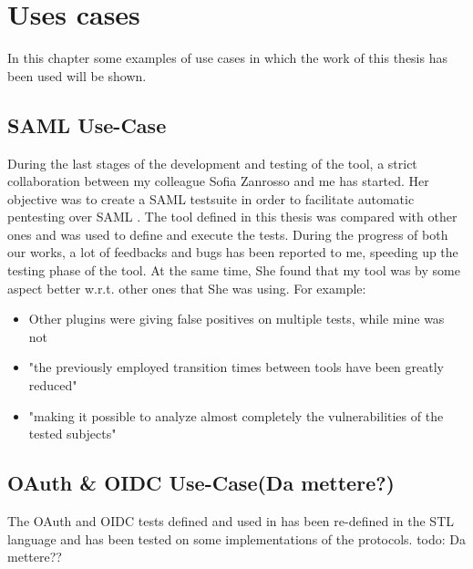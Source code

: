 \chapter{Uses cases}
\label{chap:Use_cases}
In this chapter some examples of use cases in which the work of this thesis has been used will be shown.

\section{SAML Use-Case}
During the last stages of the development and testing of the tool, a strict collaboration between my colleague Sofia Zanrosso and me has started. Her objective was to create a SAML testsuite in order to facilitate automatic pentesting over SAML \cite{sofia_zanrosso}. The tool defined in this thesis was compared with other ones and was used to define and execute the tests. During the progress of both our works, a lot of feedbacks and bugs has been reported to me, speeding up the testing phase of the tool. At the same time, She found that my tool was by some aspect better w.r.t. other ones that She was using. For example:
\begin{itemize}
    \item Other plugins were giving false positives on multiple tests, while mine was not
    \item "the previously employed transition times between tools have been greatly reduced"
    \item "making it possible to analyze almost completely the vulnerabilities of the tested subjects"
\end{itemize}


\section{OAuth \& OIDC Use-Case(Da mettere?)}
The \Gls{OAuth} and \Gls{OIDC} tests defined and used in \cite{claudio_grisenti,wendy_barreto} has been re-defined in the STL language and has been tested on some implementations of the protocols.
todo: Da mettere??




